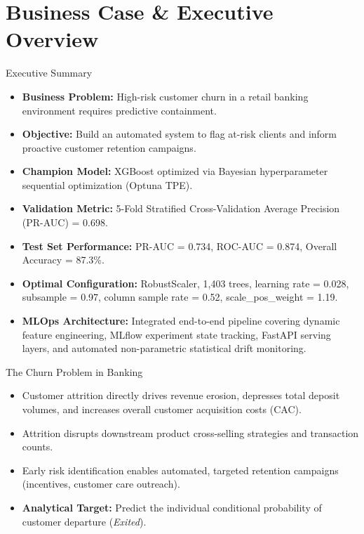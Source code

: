\section{Business Case \& Executive Overview}

\begin{frame}{Executive Summary}
\scriptsize
\begin{itemize}
    \item \textbf{Business Problem:} High-risk customer churn in a retail banking environment requires predictive containment.
    \item \textbf{Objective:} Build an automated system to flag at-risk clients and inform proactive customer retention campaigns.
    \item \textbf{Champion Model:} XGBoost optimized via Bayesian hyperparameter sequential optimization (Optuna TPE).
    \item \textbf{Validation Metric:} 5-Fold Stratified Cross-Validation Average Precision (PR-AUC) = 0.698.
    \item \textbf{Test Set Performance:} PR-AUC = 0.734, ROC-AUC = 0.874, Overall Accuracy = 87.3\%.
    \item \textbf{Optimal Configuration:} RobustScaler, 1,403 trees, learning rate = 0.028, subsample = 0.97, column sample rate = 0.52, scale\_pos\_weight = 1.19.
    \item \textbf{MLOps Architecture:} Integrated end-to-end pipeline covering dynamic feature engineering, MLflow experiment state tracking, FastAPI serving layers, and automated non-parametric statistical drift monitoring.
\end{itemize}
\end{frame}

\begin{frame}{The Churn Problem in Banking}
\begin{itemize}
    \item Customer attrition directly drives revenue erosion, depresses total deposit volumes, and increases overall customer acquisition costs (CAC).
    \item Attrition disrupts downstream product cross-selling strategies and transaction counts.
    \item Early risk identification enables automated, targeted retention campaigns (incentives, customer care outreach).
    \item \textbf{Analytical Target:} Predict the individual conditional probability of customer departure (\textit{Exited}).
\end{itemize}
\end{frame}

